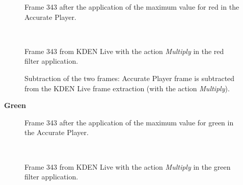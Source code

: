 \documentclass[../MasterThesis.tex]{subfiles}
\begin{document}
\begin{minipage}{0.48\textwidth}
	\begin{figure}[H]
		\begin{center}
			\caption[]{\small Frame 343 after the application of the maximum value for red in the Accurate Player.}
		\end{center}
	\end{figure}
\end{minipage}\begin{minipage}{0.04\textwidth}
	\ 
\end{minipage}\begin{minipage}{0.48\textwidth}
	\begin{figure}[H]
		\begin{center}
			\caption[]{\small Frame 343 from KDEN Live with the action \textit{Multiply} in the red filter application.}
		\end{center}
	\end{figure}
\end{minipage}

\vspace*{-1em}

\begin{figure}[H]
	\begin{center}
		\caption[]{\small Subtraction of the two frames: Accurate Player frame is subtracted from the KDEN Live frame extraction (with the action \textit{Multiply}).}
	\end{center}
\end{figure}




\vspace*{-1em}
\textbf{Green}

\vspace*{-1em}


\begin{minipage}{0.48\textwidth}
	\begin{figure}[H]
		\begin{center}
			\caption[]{\small Frame 343 after the application of the maximum value for green in the Accurate Player.}
		\end{center}
	\end{figure}
\end{minipage}\begin{minipage}{0.04\textwidth}
	\ 
\end{minipage}\begin{minipage}{0.48\textwidth}
	\begin{figure}[H]
		\begin{center}
			\caption[]{\small Frame 343 from KDEN Live with the action \textit{Multiply} in the green filter application.}
		\end{center}
	\end{figure}
\end{minipage}
\end{document}
